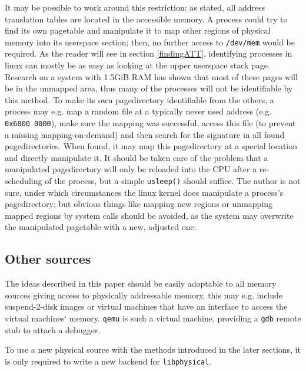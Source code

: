 It may be possible to work around this restriction: as stated, all address
translation tables are located in the accessible memory. A process could try to
find its own pagetable and manipulate it to map other regions of physical memory
into its userspace section; then, no further access to \texttt{/dev/mem} would
be required. As the reader will see in section \ref{findingATT}, identifying
processes in linux can mostly be as easy as looking at the upper userspace stack
page.  Research on a system with 1.5GiB RAM has shown that most of these pages
will be in the unmapped area, thus many of the processes will not be
identifiable by this method. To make its own pagedirectory identifiable from the
others, a process may e.g. map a random file at a typically never used address
(e.g.  \texttt{0x6000~0000}), make sure the mapping was successful, access this
file (to prevent a missing mapping-on-demand) and then search for the signature
in all found pagedirectories. When found, it may map this pagedirectory at a
special location and directly manipulate it. It should be taken care of the
problem that a manipulated pagedirectory will only be reloaded into the CPU
after a re-scheduling of the process, but a simple \texttt{usleep()} should
suffice. The author is not sure, under which circumstances the linux kernel does
manipulate a process's pagedirectory; but obvious things like mapping new
regions or unmapping mapped regions by system calls should be avoided, as the
system may overwrite the manipulated pagetable with a new, adjusted one.



\subsection{Other sources}

The ideas described in this paper should be easily adoptable to all memory
sources giving access to physically addressable memory, this may e.g. include
suspend-2-disk images or virtual machines that have an interface to access the
virtual machines` memory.  \texttt{qemu} is such a virtual machine, providing a
\texttt{gdb} remote stub to attach a debugger.

To use a new physical source with the methods introduced in the later sections,
it is only required to write a new backend for \texttt{libphysical}.

